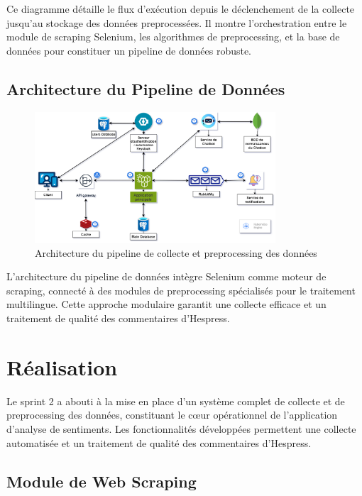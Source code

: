 Ce diagramme détaille le flux d'exécution depuis le déclenchement de la collecte jusqu'au stockage des données preprocessées. Il montre l'orchestration entre le module de scraping Selenium, les algorithmes de preprocessing, et la base de données pour constituer un pipeline de données robuste.

\subsection{Architecture du Pipeline de Données}

\begin{figure}[H]
\centering
\includegraphics[width=0.8\textwidth]{assets/images/architecture.png}
\caption{Architecture du pipeline de collecte et preprocessing des données}
\label{fig:data-pipeline-architecture}
\end{figure}

L'architecture du pipeline de données intègre Selenium comme moteur de scraping, connecté à des modules de preprocessing spécialisés pour le traitement multilingue. Cette approche modulaire garantit une collecte efficace et un traitement de qualité des commentaires d'Hespress.

\section{Réalisation}

Le sprint 2 a abouti à la mise en place d'un système complet de collecte et de preprocessing des données, constituant le cœur opérationnel de l'application d'analyse de sentiments. Les fonctionnalités développées permettent une collecte automatisée et un traitement de qualité des commentaires d'Hespress.

\subsection{Module de Web Scraping}

